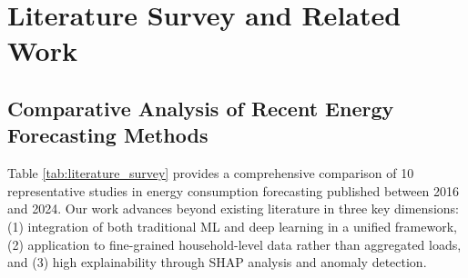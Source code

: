 
\section{Literature Survey and Related Work}
\label{sec:related}

\subsection{Comparative Analysis of Recent Energy Forecasting Methods}

Table \ref{tab:literature_survey} provides a comprehensive comparison of 10 representative studies in energy consumption forecasting published between 2016 and 2024. Our work advances beyond existing literature in three key dimensions: (1) integration of both traditional ML and deep learning in a unified framework, (2) application to fine-grained household-level data rather than aggregated loads, and (3) high explainability through SHAP analysis and anomaly detection.

